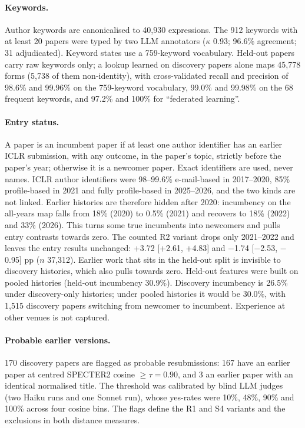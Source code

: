 \paragraph{Keywords.} Author keywords are canonicalised to 40,930 expressions. The 912 keywords with at least 20
papers were typed by two LLM annotators ($\kappa$ 0.93; 96.6\% agreement; 31 adjudicated). Keyword states use a
759-keyword vocabulary. Held-out papers carry raw keywords only; a lookup learned on discovery papers alone maps
45,778 forms (5,738 of them non-identity), with cross-validated recall and precision of 98.6\% and 99.96\% on the
759-keyword vocabulary, 99.0\% and 99.98\% on the 68 frequent keywords, and 97.2\% and 100\% for ``federated
learning''.

\paragraph{Entry status.} A paper is an incumbent paper if at least one author identifier has an earlier ICLR
submission, with any outcome, in the paper's topic, strictly before the paper's year; otherwise it is a newcomer
paper. Exact identifiers are used, never names. ICLR author identifiers were 98--99.6\% e-mail-based in 2017--2020,
85\% profile-based in 2021 and fully profile-based in 2025--2026, and the two kinds are not linked. Earlier histories
are therefore hidden after 2020: incumbency on the all-years map falls from 18\% (2020) to 0.5\% (2021) and recovers
to 18\% (2022) and 33\% (2026). This turns some true incumbents into newcomers and pulls entry contrasts towards zero.
The counted R2 variant drops only 2021--2022 and leaves the entry results unchanged: +3.72 [+2.61, +4.83] and $-$1.74
[$-$2.53, $-$0.95] pp ($n$ 37,312). Earlier work that sits in the held-out split is invisible to discovery histories,
which also pulls towards zero. Held-out features were built on pooled histories (held-out incumbency 30.9\%).
Discovery incumbency is 26.5\% under discovery-only histories; under pooled histories it would be 30.0\%, with 1,515
discovery papers switching from newcomer to incumbent. Experience at other venues is not captured.

\paragraph{Probable earlier versions.} 170 discovery papers are flagged as probable resubmissions: 167 have an earlier
paper at centred SPECTER2 cosine $\geq \tau = 0.90$, and 3 an earlier paper with an identical normalised title. The
threshold was calibrated by blind LLM judges (two Haiku runs and one Sonnet run), whose yes-rates were 10\%, 48\%,
90\% and 100\% across four cosine bins. The flags define the R1 and S4 variants and the exclusions in both distance
measures.


